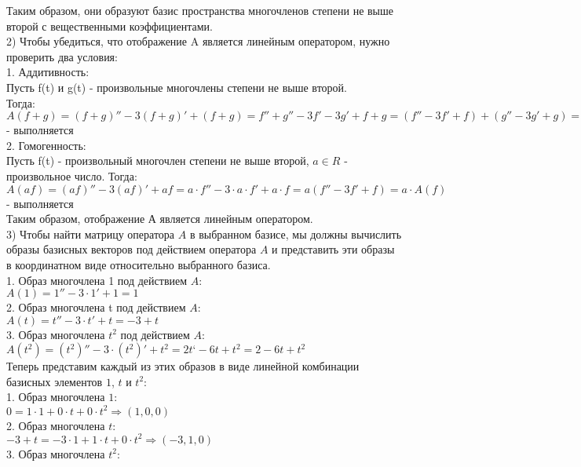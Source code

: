 \documentclass{article}
\begin{document}
    Таким образом, они образуют базис пространства многочленов степени
    не выше второй с вещественными коэффициентами.\\
    2) Чтобы убедиться, что отображение A является линейным оператором,
    нужно проверить два условия: \\
    1. Аддитивность:\\
    Пусть f(t) и g(t) - произвольные многочлены степени не выше второй.\\
    Тогда:\\
    $A(f + g) = (f + g)'' - 3(f + g)' + (f + g) = f '' + g'' - 3f ' - 3g' + f + g = (f '' - 3f ' + f) + (g'' -
    3g' + g) = A(f) + A(g)$ - выполняется\\
    2. Гомогенность:\\
    Пусть f(t) - произвольный многочлен степени не выше второй, $a \in R$ -
    произвольное число. Тогда:\\
    $A(af) = (af)'' - 3(af)' + af = a \cdot  f '' - 3 \cdot  a  \cdot  f ' + a \cdot  f = a(f '' - 3f ' + f) = a \cdot  A(f)$ -
    выполняется\\
    Таким образом, отображение А является линейным оператором.\\
    3) Чтобы найти матрицу оператора $A$ в выбранном базисе, мы должны
    вычислить образы базисных векторов под действием оператора $A$ и
    представить эти образы в координатном виде относительно выбранного
    базиса. \\
    1. Образ многочлена 1 под действием $A$:\\
    $A(1) = 1'' - 3  \cdot  1' + 1 = 1$\\
    2. Образ многочлена t под действием $A$:\\
    $A(t) = t'' - 3  \cdot  t' + t = -3 + t$\\
    3. Образ многочлена $t^2$ под действием $A$:\\
    $A(t^2) = (t^2)'' - 3  \cdot  (t^2)' + t^2 = 2t‘ - 6t + t^2 = 2 - 6t + t^2$\\
    Теперь представим каждый из этих образов в виде линейной
    комбинации базисных элементов $1$, $t$ и $t^2$:\\
    1. Образ многочлена $1$:\\
    $0 = 1  \cdot  1 + 0  \cdot  t + 0  \cdot  t^2 \Rightarrow (1, 0, 0)$\\
    2. Образ многочлена $t$:\\
    $-3 + t = -3  \cdot  1 + 1  \cdot  t + 0  \cdot  t^2 \Rightarrow (-3, 1, 0)$\\
    3. Образ многочлена $t^2$:\\
\end{document}
